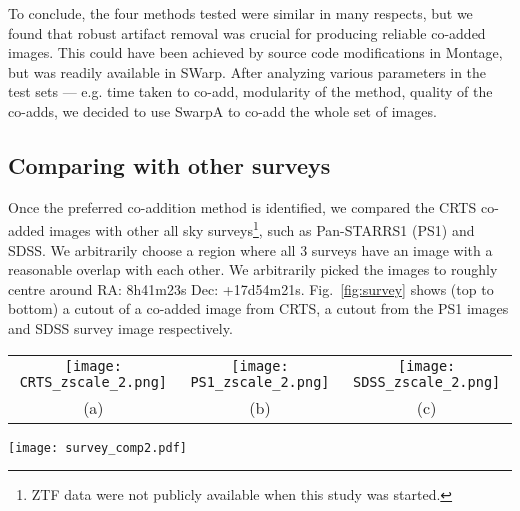\documentclass[fleqn,usenatbib]{mnras}
\begin{document}
To conclude, the four methods tested were similar in many respects, but we found that robust artifact removal was crucial for producing reliable co-added images. This could have been achieved by source code modifications in Montage, but was readily available in SWarp. After analyzing various parameters in the test sets --- e.g. time taken to co-add, modularity of the method, quality of the co-adds, we decided to use SwarpA to co-add the whole set of images. 

 
 \subsection{\label{sec:com_sur}Comparing with other surveys}
Once the preferred co-addition method is identified, we compared the CRTS co-added images with other all sky surveys\footnote{ZTF data were not publicly available when this study was started. }, such as Pan-STARRS1 (PS1) and SDSS. We arbitrarily  choose a region where all 3 surveys have an image with a reasonable overlap with each other. We arbitrarily picked the images to roughly centre around RA: 8h41m23s  Dec: +17d54m21s. Fig.~\ref{fig:survey}
shows (top to bottom) a cutout of a co-added image from CRTS, a cutout from the PS1 images and SDSS survey image respectively. 



\begin{figure*}
\centering
\begin{tabular}{ccc}
{\texttt{[image: CRTS\_zscale\_2.png]}} & {\texttt{[image: PS1\_zscale\_2.png]}} & {\texttt{[image: SDSS\_zscale\_2.png]}}\\
(a) & (b) & (c)
\end{tabular}
\caption{\label{fig:survey}
A small $\sim3\arcmin.8 \times 3\arcmin.0 $ postage stamp around $\alpha = 8^h 41^m 23^s, \delta = +17\degr 55\arcmin 33\arcsec$ (130.34622\degr, 17.926073\degr) with intensities z-scaled to compare three different sky surveys.
From left to right: a) co-added image from CRTS, b) corresponding cutout from PS1 in $g$-band, and c) SDSS survey image in $g$-band. The limiting magnitude comparisons were done on a larger area centred on these coordinates (Sec.~\ref{sec:com_sur}).
}
\end{figure*}
 

 
\begin{figure*}
\texttt{[image: survey\_comp2.pdf]}
\caption{Histograms of magnitudes of sources detected in various surveys in a 30\arcsec\ region centred at $\alpha = 8^h 41^m 23^s, \delta = +17\degr 55\arcmin 33\arcsec$ (Sec.~\ref{sec:com_sur}). The vertical dash-dotted lines show the mode and the halfway point as discussed in Fig~\ref{fig:mag_hist}. From left to right: unfiltered zero corrected CRTS, $g$-band sources in PanSTARRS, and $g$-band sources with $\Delta m_g < 0.2$ in SDSS. Number of sources within the histogram for CRTS, PS1, SDSS are 7774, 8004, 11852 respectively.}
\label{fig:survey_hist} 
\end{figure*}
\end{document}
